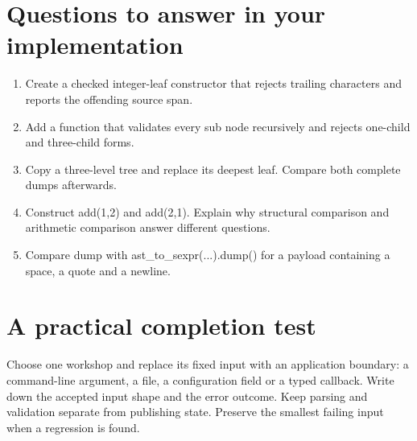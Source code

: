 \section*{Questions to answer in your implementation}
\begin{enumerate}
\item Create a checked integer-leaf constructor that rejects trailing characters and reports the offending source span.
\item Add a function that validates every sub node recursively and rejects one-child and three-child forms.
\item Copy a three-level tree and replace its deepest leaf. Compare both complete dumps afterwards.
\item Construct add(1,2) and add(2,1). Explain why structural comparison and arithmetic comparison answer different questions.
\item Compare dump with ast\_to\_sexpr(...).dump() for a payload containing a space, a quote and a newline.
\end{enumerate}
\section*{A practical completion test}
Choose one workshop and replace its fixed input with an application boundary: a command-line argument, a file, a configuration field or a typed callback. Write down the accepted input shape and the error outcome. Keep parsing and validation separate from publishing state. Preserve the smallest failing input when a regression is found.

